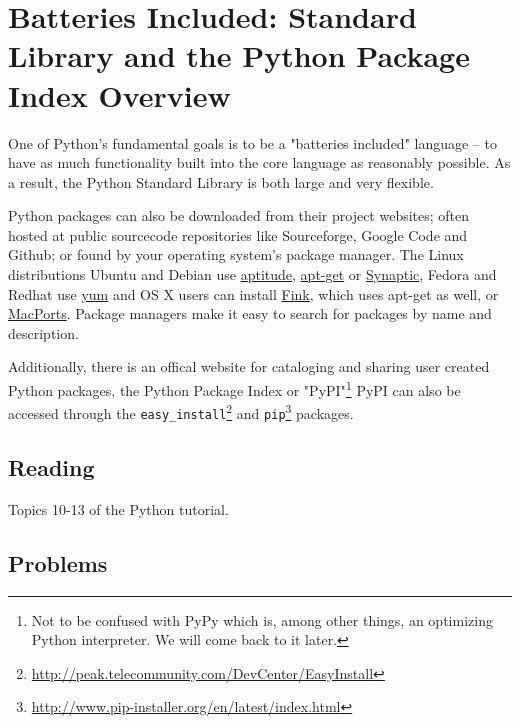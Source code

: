 \section{ Batteries Included: Standard Library and the Python Package Index Overview}

One of Python's fundamental goals is to be a "batteries included" language -- to have as much functionality built into the core language as reasonably possible. As a result, the Python Standard Library is both large and very flexible. 

Python packages can also be downloaded from their project websites; often hosted at public sourcecode repositories like Sourceforge, Google Code and Github; or found by your operating system's \gls{package manager}. The Linux distributions Ubuntu and Debian use \href{http://wiki.debian.org/Aptitude?action=show&redirect=aptitude}{aptitude}, \href{http://wiki.debian.org/Apt}{apt-get} or \href{https://help.ubuntu.com/community/SynapticHowto}{Synaptic}, Fedora and Redhat use \href{http://yum.baseurl.org/}{yum} and OS X users can install \href{http://www.finkproject.org/}{Fink}, which uses apt-get as well, or \href{http://www.macports.org/index.php}{MacPorts}. Package managers make it easy to search for packages by name and description.

Additionally, there is an offical website for cataloging and sharing user created Python packages, the Python Package Index or "PyPI"\footnote{Not to be confused with PyPy which is, among other things, an optimizing Python interpreter. We will come back to it later.} PyPI can also be accessed through the \verb|easy_install|\footnote{\url{http://peak.telecommunity.com/DevCenter/EasyInstall}} and \verb|pip|\footnote{\url{http://www.pip-installer.org/en/latest/index.html}} packages.

\subsection{Reading}
Topics 10-13 of the Python tutorial.  

\subsection{Problems}

